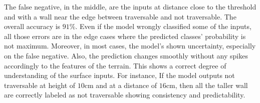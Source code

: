 \documentclass[../document.tex]{subfiles}
\begin{document}
The false negative, in the middle, are the inputs at distance close to the threshold and with a wall near the edge between traversable and not traversable. The overall accuracy is $91\%$. Even if the model wrongly classified some of the inputs, all those errors are in the edge cases where the predicted classes' probability is not maximum. Moreover, in most cases, the model's shown uncertainty, especially on the false negative. Also, the prediction changes smoothly without any spikes accordingly to the features of the terrain. This shows a correct degree of understanding of the surface inputs. For instance, If the model outputs not traversable at height of $10$cm and at a distance of $16$cm, then all the taller wall are correctly labeled as not traversable showing consistency and predictability. 

    
\end{document}
